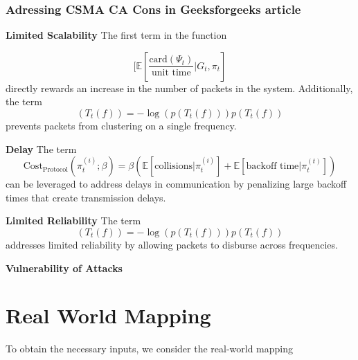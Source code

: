 \documentclass{article}
\begin{document}
\subsubsection{Adressing CSMA CA Cons in Geeksforgeeks article}

\textbf{Limited Scalability}
The first term in the function

$$
[ \mathbb{E}[\frac{\text{card}(\Psi_{t})}{\text{unit time}} | G_{t}, \pi_{t}]
$$
directly rewards an increase in the number of packets in the system. Additionally, the term
$$
(T_{t}(f))= -\log(p(T_{t}(f))) p(T_{t}(f))
$$
prevents packets from clustering on a single frequency.

\textbf{Delay}
The term
$$
\text{Cost}_{\text{Protocol}}(\pi_{t}^{(i)}; \beta) = \beta (\mathbb{E}[ \text{collisions} | \pi_{t}^{(i)}] + \mathbb{E}[ \text{backoff time} | \pi_{t}^{(t)}])
$$
can be leveraged to address delays in communication by penalizing large backoff times that create transmission delays. 

\textbf{Limited Reliability}
The term
$$
(T_{t}(f))= -\log(p(T_{t}(f))) p(T_{t}(f))
$$
addresses limited reliability by allowing packets to disburse across frequencies.

\textbf{Vulnerability of Attacks}

\newpage

\section{Real World Mapping}

To obtain the necessary inputs, we consider the real-world mapping
\end{document}
